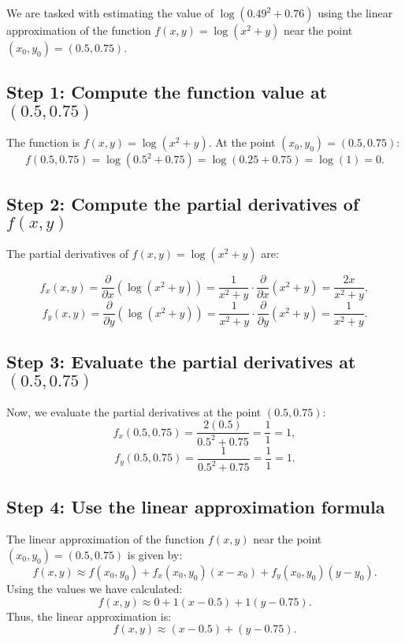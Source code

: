 \documentclass[11pt]{article}
\begin{document}
We are tasked with estimating the value of \( \log(0.49^2 + 0.76) \) using the linear approximation of the function \( f(x, y) = \log(x^2 + y) \) near the point \( (x_0, y_0) = (0.5, 0.75) \).

\newpage

\subsection{Step 1: Compute the function value at \( (0.5, 0.75) \)}

The function is \( f(x, y) = \log(x^2 + y) \). At the point \( (x_0, y_0) = (0.5, 0.75) \):
\[
f(0.5, 0.75) = \log(0.5^2 + 0.75) = \log(0.25 + 0.75) = \log(1) = 0.
\]

\newpage

\subsection{Step 2: Compute the partial derivatives of \( f(x, y) \)}

The partial derivatives of \( f(x, y) = \log(x^2 + y) \) are:

\[
f_x(x, y) = \frac{\partial}{\partial x} \left( \log(x^2 + y) \right) = \frac{1}{x^2 + y} \cdot \frac{\partial}{\partial x} (x^2 + y) = \frac{2x}{x^2 + y},
\]
\[
f_y(x, y) = \frac{\partial}{\partial y} \left( \log(x^2 + y) \right) = \frac{1}{x^2 + y} \cdot \frac{\partial}{\partial y} (x^2 + y) = \frac{1}{x^2 + y}.
\]

\newpage

\subsection{Step 3: Evaluate the partial derivatives at \( (0.5, 0.75) \)}

Now, we evaluate the partial derivatives at the point \( (0.5, 0.75) \):
\[
f_x(0.5, 0.75) = \frac{2(0.5)}{0.5^2 + 0.75} = \frac{1}{1} = 1,
\]
\[
f_y(0.5, 0.75) = \frac{1}{0.5^2 + 0.75} = \frac{1}{1} = 1.
\]

\newpage

\subsection{Step 4: Use the linear approximation formula}

The linear approximation of the function \( f(x, y) \) near the point \( (x_0, y_0) = (0.5, 0.75) \) is given by:
\[
f(x, y) \approx f(x_0, y_0) + f_x(x_0, y_0)(x - x_0) + f_y(x_0, y_0)(y - y_0).
\]
Using the values we have calculated:
\[
f(x, y) \approx 0 + 1(x - 0.5) + 1(y - 0.75).
\]
Thus, the linear approximation is:
\[
f(x, y) \approx (x - 0.5) + (y - 0.75).
\]
\end{document}
